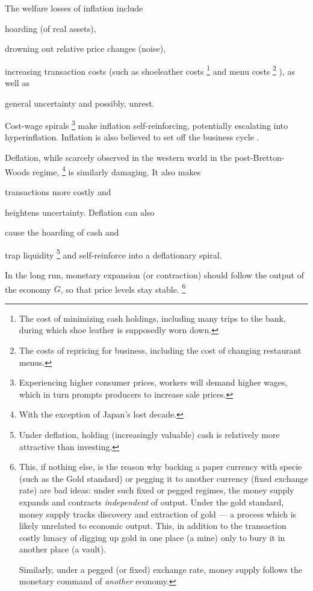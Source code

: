 The welfare losses of inflation include \begin{inparaenum}
	\item hoarding (of real assets),
	\item drowning out relative price changes (noise),
	\item increasing transaction costs (such as shoeleather costs
	\footnote{
		The cost of minimizing cash holdings, including many trips to the bank, during which shoe leather is supposedly worn down.
	}
	and menu costs
	\footnote{
		The costs of repricing for business, including the cost of changing restaurant menus.
	}
	), as well as
	\item general uncertainty and possibly, unrest.
	\end{inparaenum}
Cost-wage spirals
\footnote{
	Experiencing higher consumer prices, workers will demand higher wages, which in turn prompts producers to increase sale prices.
}
make inflation self-reinforcing, potentially escalating into hyperinflation.
Inflation is also believed to set off the business cycle \citep{Friedman1970}.

Deflation, while scarcely observed in the western world in the post-Bretton-Woods regime,
\footnote{
	With the exception of Japan's lost decade.
}
is similarly damaging.
It also makes \begin{inparaenum}[\itshape 1\upshape)]
	\item transactions more costly and
	\item heightens uncertainty.
Deflation can also
	\item cause the hoarding of cash and
	\item trap liquidity
	\footnote{
		Under deflation, holding (increasingly valuable) cash is relatively more attractive than investing.
	}
	and self-reinforce into a deflationary spiral.
	\end{inparaenum}

In the long run, monetary expansion (or contraction) should follow the output of the economy $G$, so that price levels stay stable.
\footnote{
	This, if nothing else, is the reason why backing a paper currency with specie (such as the Gold standard) or pegging it to another currency (fixed exchange rate) are bad ideas:
	under such fixed or pegged regimes, the money supply expands and contracts \emph{independent} of output.
	Under the gold standard, money supply tracks discovery and extraction of gold --- a process which is likely unrelated to economic output.
	This, in addition to the transaction costly lunacy of digging up gold in one place (a mine) only to bury it in another place (a vault).

	Similarly, under a pegged (or fixed) exchange rate, money supply follows the monetary command of \emph{another} economy.
}


